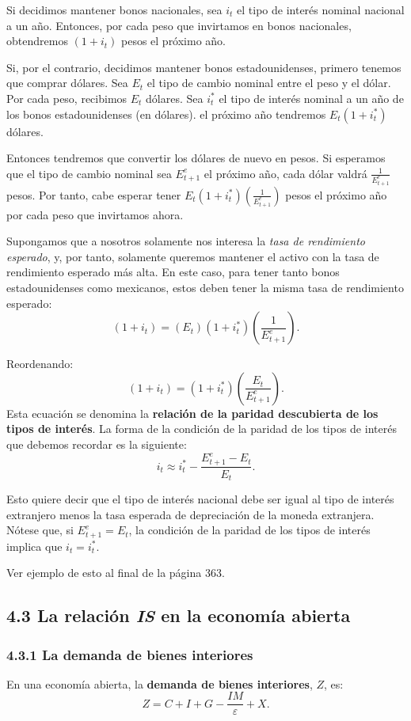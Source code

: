 \documentclass[10pt]{article}
\begin{document}
\begin{multicols*}{2}
Si decidimos mantener bonos nacionales, sea $i_t$ el tipo de interés nominal nacional a un año. Entonces, por cada peso que invirtamos en bonos nacionales, obtendremos $(1+i_t)$ pesos el próximo año.

Si, por el contrario, decidimos mantener bonos estadounidenses, primero tenemos que comprar dólares. Sea $E_t$ el tipo de cambio nominal entre el peso y el dólar. Por cada peso, recibimos $E_t$ dólares. Sea $i_t^*$ el tipo de interés nominal a un año de los bonos estadounidenses (en dólares). el próximo año tendremos $E_t(1+i_t^*)$ dólares. 

Entonces tendremos que convertir los dólares de nuevo en pesos. Si esperamos que el tipo de cambio nominal sea $E_{t+1}^e$ el próximo año, cada dólar valdrá $\frac{1}{E_{t+1}^e}$ pesos. Por tanto, cabe esperar tener $E_t(1+i_t^*)(\frac{1}{E_{t+1}^e})$ pesos el próximo año por cada peso que invirtamos ahora.

Supongamos que a nosotros solamente nos interesa la \textit{tasa de rendimiento esperado}, y, por tanto, solamente queremos mantener el activo con la tasa de rendimiento esperado más alta. En este caso, para tener tanto bonos estadounidenses como mexicanos, estos deben tener la misma tasa de rendimiento esperado:
\[ (1+i_t) = (E_t)(1+i_t^*)\left(\frac{1}{E_{t+1}^e}\right). \]

Reordenando:
\[ (1+i_t) = (1+i_t^*)\left(\frac{E_t}{E_{t+1}^e}\right).\]
Esta ecuación se denomina la \textbf{relación de la paridad descubierta de los tipos de interés}. La forma de la condición de la paridad de los tipos de interés que debemos recordar es la siguiente:
\[ i_t \approx i_t^* - \frac{E_{t+1}^e - E_t}{E_t}. \]

Esto quiere decir que el tipo de interés nacional debe ser igual al tipo de interés extranjero menos la tasa esperada de depreciación de la moneda extranjera. Nótese que, si $E_{t+1}^e = E_t$, la condición de la paridad de los tipos de interés implica que $i_t = i_t^*$.

Ver ejemplo de esto al final de la página 363.

\subsection{4.3 La relación \textit{IS} en la economía abierta}
\subsubsection{4.3.1 La demanda de bienes interiores}
En una economía abierta, la \textbf{demanda de bienes interiores}, $Z$, es:
\[ Z = C + I + G - \frac{IM}{\varepsilon}+X. \]


\end{multicols*}
\end{document}
